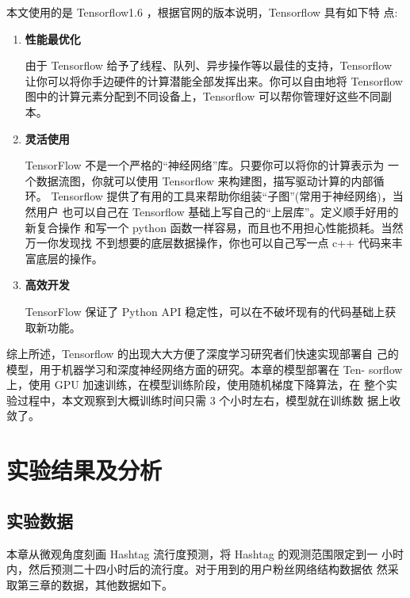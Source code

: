本文使用的是 Tensorflow1.6 ，根据官网的版本说明，Tensorflow 具有如下特 点:
\begin{enumerate}

\item \bfseries 性能最优化\mdseries 

由于 Tensorflow 给予了线程、队列、异步操作等以最佳的支持，Tensorflow 让你可以将你手边硬件的计算潜能全部发挥出来。你可以自由地将 Tensorflow图中的计算元素分配到不同设备上，Tensorflow 可以帮你管理好这些不同副本。

\item  \bfseries 灵活使用 \mdseries  

TensorFlow 不是一个严格的“神经网络”库。只要你可以将你的计算表示为 一个数据流图，你就可以使用 Tensorflow 来构建图，描写驱动计算的内部循环。 Tensorflow 提供了有用的工具来帮助你组装“子图”(常用于神经网络)，当然用户 也可以自己在 Tensorflow 基础上写自己的“上层库”。定义顺手好用的新复合操作 和写一个 python 函数一样容易，而且也不用担心性能损耗。当然万一你发现找 不到想要的底层数据操作，你也可以自己写一点 c++ 代码来丰富底层的操作。

\item   \bfseries 高效开发\mdseries 

TensorFlow 保证了 Python API 稳定性，可以在不破坏现有的代码基础上获 取新功能。

\end{enumerate}

综上所述，Tensorflow 的出现大大方便了深度学习研究者们快速实现部署自 己的模型，用于机器学习和深度神经网络方面的研究。本章的模型部署在 Ten- sorflow 上，使用 GPU 加速训练，在模型训练阶段，使用随机梯度下降算法，在 整个实验过程中，本文观察到大概训练时间只需 3 个小时左右，模型就在训练数 据上收敛了。


\section{实验结果及分析}

\subsection{实验数据}
本章从微观角度刻画 Hashtag 流行度预测，将 Hashtag 的观测范围限定到一 小时内，然后预测二十四小时后的流行度。对于用到的用户粉丝网络结构数据依 然采取第三章的数据，其他数据如下。

